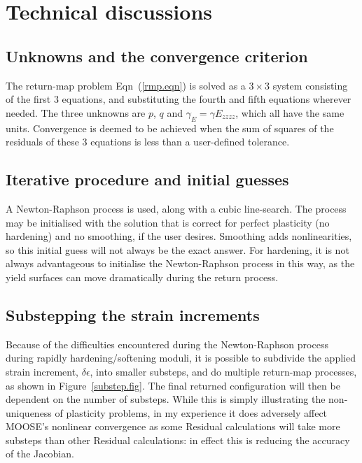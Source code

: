 \documentclass[]{scrreprt}
\newcommand{\ga}{\gamma}
\begin{document}
\chapter{Technical discussions}

\section{Unknowns and the convergence criterion}
The return-map problem Eqn~(\ref{rmp.eqn}) is solved as a $3\times 3$
system consisting of the first 3 equations, and substituting the fourth and
fifth equations wherever needed.  The three unknowns are $p$, $q$ and
$\ga_{E}=\gamma E_{zzzz}$, which all have the same units.  Convergence
is deemed to be achieved when the sum of squares of the residuals of
these 3 equations is less than a user-defined tolerance.

\section{Iterative procedure and initial guesses}
A Newton-Raphson process is used, along with a cubic line-search.  The
process may be initialised with the solution that is correct for
perfect plasticity (no hardening) and no smoothing, if the user
desires.  Smoothing adds nonlinearities, so this initial guess will
not always be the exact answer. For hardening, it is not
always advantageous to initialise the Newton-Raphson process in this
way, as the yield surfaces can move dramatically during the return
process.

\section{Substepping the strain increments}
Because of the difficulties encountered during the Newton-Raphson
process during rapidly hardening/softening moduli, it is possible to
subdivide the applied strain increment, $\delta\epsilon$, into smaller
substeps, and do multiple return-map processes, as shown in
Figure~\ref{substep.fig}.  The final returned configuration will then
be dependent on the number of substeps.  While this is simply
illustrating the non-uniqueness of plasticity problems, in my
experience it does adversely affect MOOSE's nonlinear convergence as
some Residual calculations will take more substeps than other Residual
calculations: in effect this is reducing the accuracy of the Jacobian.
\end{document}
